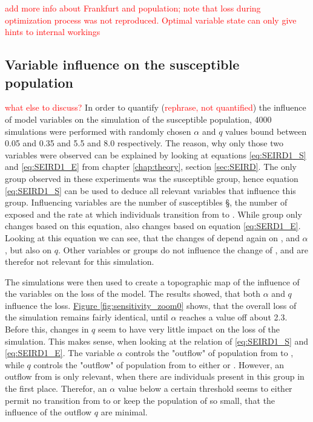 \textcolor{red}{add more info about Frankfurt and population; note that loss during optimization process was not reproduced.
Optimal variable state can only give hints to internal workings}

\subsection{Variable influence on the susceptible population}
\textcolor{red}{what else to discuss?}\newline %
In order to quantify (\textcolor{red}{rephrase, not quantified}) the influence of model variables on the simulation of the
susceptible population, 4000 simulations were performed with randomly chosen $\alpha$ and $q$ values bound between 0.05 and 0.35
and 5.5 and 8.0 respectively. The reason, why only those two variables were observed can be explained by looking at equations
\ref{eq:SEIRD1_S} and \ref{eq:SEIRD1_E} from chapter \ref*{chap:theory},
section \ref*{sec:SEIRD}. The only group observed in these experiments was the susceptible group, hence equation \ref*{eq:SEIRD1_S}
can be used to deduce all relevant variables that influence this group. Influencing variables are the number of susceptibles \S,
the number of exposed  and the rate at which individuals transition from  to . While group  only changes based on this
equation,  also changes based on equation \ref*{eq:SERD1_E}. Looking at this equation we can see, that the changes of  depend
again on ,  and $\alpha$, but also on $q$. Other variables or groups do not influence the change of , and are therefor not
relevant for this simulation. \newline

The simulations were then used to create a topographic map of the influence of the variables on the loss of the model. The results
showed, that both $\alpha$ and $q$ influence the loss. \hyperref[fig:sensitivity_zoom0]{Figure \ref*{fig:sensitivity_zoom0}} shows,
that the overall loss of the simulation remains fairly identical, until $\alpha$ reaches a value off about 2.3. Before this,
changes in $q$ seem to have very little impact on the loss of the simulation. This makes sense, when looking at the relation of
\ref*{eq:SEIRD1_S} and \ref*{eq:SEIRD1_E}. The variable $\alpha$ controls the "outflow" of population from  to , while $q$
controls the "outflow" of population from  to either  or . However, an outflow from  is only relevant, when there are
individuals present in this group in the first place. Therefor, an $\alpha$ value below a certain threshold seems to either permit
no transition from  to  or keep the population of  so small, that the influence of the outflow $q$ are minimal.\newline


